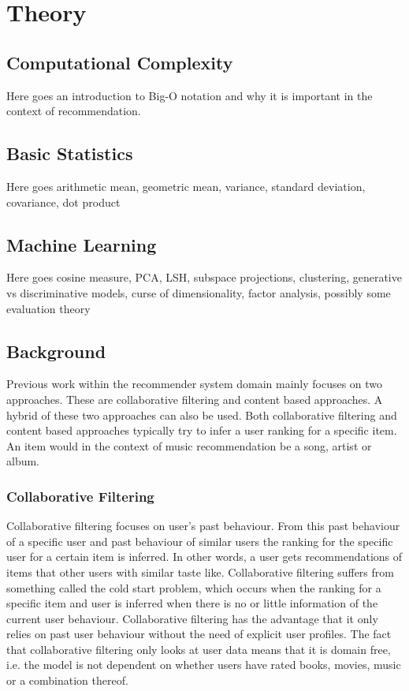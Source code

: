 \documentclass[a4paper,11pt]{kth-mag}
\begin{document}
\part{Theory}

\chapter{Computational Complexity}
Here goes an introduction to Big-O notation and why it is important in the context of recommendation.

\chapter{Basic Statistics}
Here goes arithmetic mean, geometric mean, variance, standard deviation, covariance, dot product

\chapter{Machine Learning}
Here goes cosine measure, PCA, LSH, subspace projections, clustering, generative vs discriminative models, curse of dimensionality, factor analysis, possibly some evaluation theory

\chapter{Background}

Previous work within the recommender system domain mainly focuses on two approaches. These are collaborative filtering and content based approaches. A hybrid of these two approaches can also be used. Both collaborative filtering and content based approaches typically try to infer a user ranking for a specific item\cite{melville2002content}. An item would in the context of music recommendation be a song, artist or album.

\section{Collaborative Filtering}
Collaborative filtering focuses on user's past behaviour. From this past behaviour of a specific user and past behaviour of similar users the ranking for the specific user for a certain item is inferred\cite{sarwar2001item}\cite{su2009survey}. In other words, a user gets recommendations of items that other users with similar taste like\cite{adomavicius2005toward}. Collaborative filtering suffers from something called the cold start problem, which occurs when the ranking for a specific item and user is inferred when there is no or little information of the current user behaviour\cite{herlocker2004evaluating}. Collaborative filtering has the advantage that it only relies on past user behaviour without the need of explicit user profiles. The fact that collaborative filtering only looks at user data means that it is domain free, i.e. the model is not dependent on whether users have rated books, movies, music or a combination thereof\cite{hu2008collaborative}.
\end{document}
